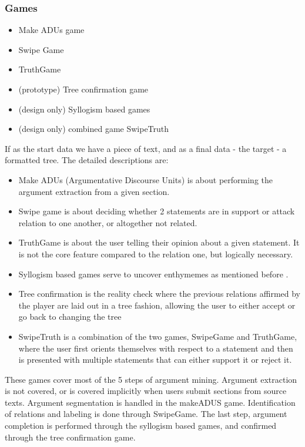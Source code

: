 \documentclass{report}
\begin{document}
\subsubsection{Games}
\begin{itemize}
  \item Make ADUs game
  \item Swipe Game
  \item TruthGame 
  \item (prototype) Tree confirmation game
  \item (design only) Syllogism based games
  \item (design only) combined game SwipeTruth
\end{itemize}
If as the start data we have a piece of text, and as a final data - the target - a formatted tree.
The detailed descriptions are:
\begin{itemize}
  \item Make ADUs (Argumentative Discourse Units) is about performing the argument extraction from a given section.
  \item Swipe game is about deciding whether 2 statements are in support or attack relation to one another, or altogether not related.
  \item TruthGame is about the user telling their opinion about a given statement. It is not the core feature compared to the relation one, but logically necessary.
  \item Syllogism based games serve to uncover enthymemes as mentioned before \cite{noauthor_finding_nodate}. 
  \item Tree confirmation is the reality check where the previous relations affirmed by the player are laid out in a tree fashion, allowing the user to either accept or go back to changing the tree
  \item SwipeTruth is a combination of the two games, SwipeGame and TruthGame, where the user first orients themselves with respect to a statement and then is presented with multiple statements that can either support it or reject it.
\end{itemize}

These games cover most of the 5 steps of argument mining. 
Argument extraction is not covered, or is covered implicitly when users submit sections from source texts. Argument segmentation is handled in the makeADUS game. Identification of relations and labeling is done through SwipeGame. The last step, argument completion is performed through the syllogism based games, and confirmed through the tree confirmation game.
\end{document}
